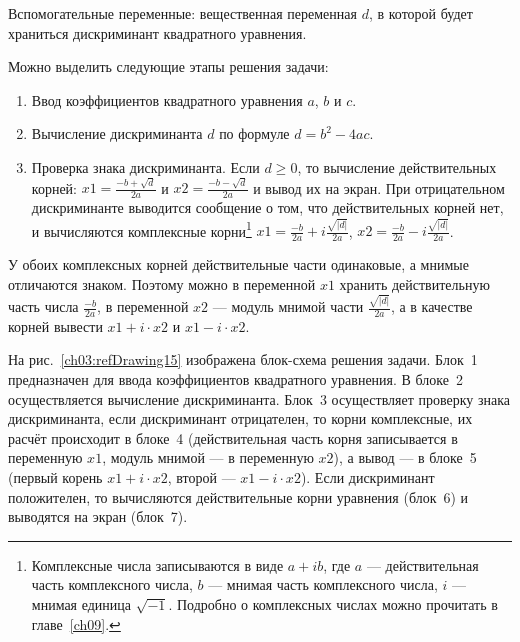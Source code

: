 Вспомогательные переменные: вещественная переменная $d$, в которой будет храниться дискриминант
квадратного уравнения.

Можно выделить следующие этапы решения задачи:
\begin{enumerate}
\item Ввод коэффициентов квадратного уравнения $a$, $b$ и $c$.
\item Вычисление дискриминанта $d$ по формуле  $d=b^2-4ac$.
\item Проверка знака дискриминанта. Если $d\geqslant 0$, то вычисление действительных корней:
 $x1=\frac{-b+\sqrt{d}}{2a}$  и  $x2=\frac{-b-\sqrt{d}}{2a}$ 
и вывод их на экран. При отрицательном дискриминанте выводится сообщение о том, что действительных корней нет, и
вычисляются комплексные корни\footnote{Комплексные числа записываются в виде
$a+ib$, где $a$ --- действительная часть комплексного числа,
$b$ --- мнимая часть комплексного числа, $i$ --- мнимая единица  $\sqrt{-1}$. Подробно о комплексных числах можно прочитать в главе~\ref{ch09}.}
 $x1=\frac{-b}{2a}+i\frac{\sqrt{\left|{d}\right|}}{2a}$, 
$x2=\frac{-b}{2a}-i\frac{\sqrt{\left|{d}\right|}}{2a}$.
\end{enumerate}

У обоих комплексных корней действительные части одинаковые, а мнимые отличаются знаком. Поэтому можно в переменной
$x1$ хранить действительную часть числа  $\frac{-b}{2a}$, в переменной $x2$ --- модуль мнимой части 
$\frac{\sqrt{\left|{d}\right|}}{2a}$, а в качестве корней вывести 
$x1 + i\cdot x2$  и  $x1 - i\cdot x2$. 

На рис.~\ref{ch03:refDrawing15} изображена блок-схема решения задачи. Блок~1 предназначен для ввода коэффициентов квадратного
уравнения. В блоке~2 осуществляется вычисление дискриминанта. Блок~3 осуществляет проверку знака дискриминанта, если
дискриминант отрицателен, то корни комплексные, их расчёт происходит в блоке~4 (действительная часть корня записывается
в переменную $x1$, модуль мнимой --- в переменную $x2$), а вывод --- в блоке~5 (первый
корень $x1 + i\cdot x2$, второй --- $x1 - i\cdot x2$). Если дискриминант положителен, то
вычисляются действительные корни уравнения (блок~6) и выводятся на экран (блок~7).

